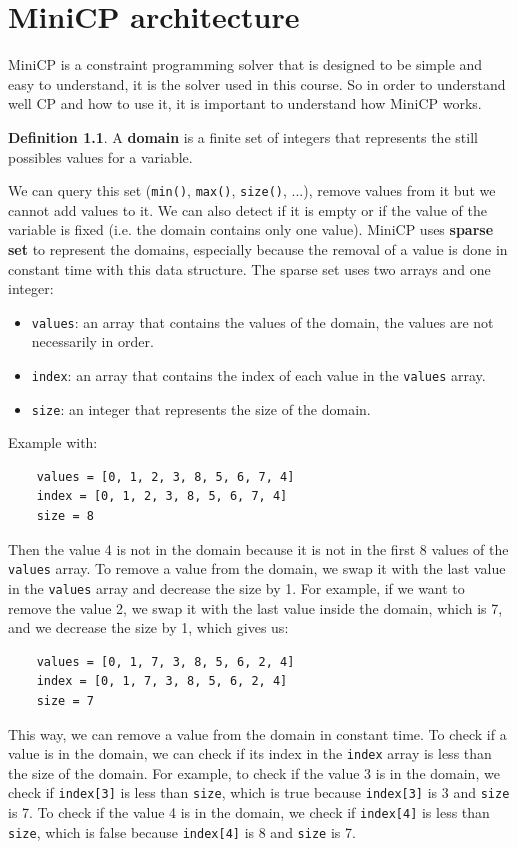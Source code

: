 \documentclass[12pt, openany]{report}
\theoremstyle{definition}
\newtheorem{definition}[thm]{Definition}
\begin{document}
\chapter{MiniCP architecture}
MiniCP is a constraint programming solver that is designed to be simple and easy to understand, it is the solver used in this course. So in order to understand well CP and how to use it, it is important to understand how MiniCP works.
\begin{definition}
    A \textbf{domain} is a finite set of integers that represents the still possibles values for a variable.
\end{definition}
We can query this set (\texttt{min()}, \texttt{max()}, \texttt{size()}, ...), remove values from it but we cannot add values to it. We can also detect if it is empty or if the value of the variable is fixed (i.e. the domain contains only one value). MiniCP uses \textbf{sparse set} to represent the domains, especially because the removal of a value is done in constant time with this data structure. The sparse set uses two arrays and one integer:
\begin{itemize}
    \item \texttt{values}: an array that contains the values of the domain, the values are not necessarily in order.
    \item \texttt{index}: an array that contains the index of each value in the \texttt{values} array.
    \item \texttt{size}: an integer that represents the size of the domain.
\end{itemize}
Example with:
\begin{lstlisting}
    values = [0, 1, 2, 3, 8, 5, 6, 7, 4]
    index = [0, 1, 2, 3, 8, 5, 6, 7, 4]
    size = 8
\end{lstlisting}
Then the value 4 is not in the domain because it is not in the first 8 values of the \texttt{values} array. To remove a value from the domain, we swap it with the last value in the \texttt{values} array and decrease the size by 1. For example, if we want to remove the value 2, we swap it with the last value inside the domain, which is 7, and we decrease the size by 1, which gives us:
\begin{lstlisting}
    values = [0, 1, 7, 3, 8, 5, 6, 2, 4]
    index = [0, 1, 7, 3, 8, 5, 6, 2, 4]
    size = 7
\end{lstlisting}
This way, we can remove a value from the domain in constant time. To check if a value is in the domain, we can check if its index in the \texttt{index} array is less than the size of the domain. For example, to check if the value 3 is in the domain, we check if \texttt{index[3]} is less than \texttt{size}, which is true because \texttt{index[3]} is 3 and \texttt{size} is 7. To check if the value 4 is in the domain, we check if \texttt{index[4]} is less than \texttt{size}, which is false because \texttt{index[4]} is 8 and \texttt{size} is 7.
\end{document}
